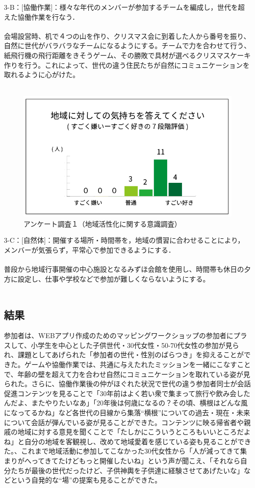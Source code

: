 \documentclass[a4paper]{jsarticle}
\begin{document}
3-B：[協働作業]：様々な年代のメンバーが参加するチームを編成し，世代を超えた協働作業を行なう．\\\\
会場設営時、机で４つの山を作り、クリスマス会に到着した人から番号を振り、自然に世代がバラバラなチームになるようにする。チームで力を合わせて行う、紙飛行機の飛行距離をきそうゲーム、その勝敗で具材が選べるクリスマスケーキ作りを行う。これによって、世代の違う住民たちが自然にコミュニケーションを取れるように心がけた。\\\\
\begin{figure}[H]
  \begin{center}
    \includegraphics[width=0.95\hsize]{./images/03.png}
    \caption{アンケート調査１（地域活性化に関する意識調査）}
    \label{fig:tmu_hino}
  \end{center}
\end{figure}
3-C：[自然体]：開催する場所・時間帯を，地域の慣習に合わせることにより，メンバーが気張らず，平常心で参加できるようにする．\\\\
普段から地域行事開催の中心施設となるみずほ会館を使用し、時間帯も休日の夕方に設定し、仕事や学校などで参加が難しくならないようにする。\\\\
\subsection{結果}
参加者は、WEBアプリ作成のためのマッピングワークショップの参加者にプラスして、小学生を中心とした子供世代・30代女性・50-70代女性の参加が見られ、課題としてあげられた「参加者の世代・性別のばらつき」を抑えることができた。ゲームや協働作業では、共通に与えたれたミッションを一緒にこなすことで、年齢の壁を超えて力を合わせ自然にコミュニケーションを取れている姿が見られた。さらに、協働作業後の仲がほぐれた状況で世代の違う参加者同士が会話促進コンテンツを見ることで「30年前はよく若い衆で集まって旅行や飲み会したんだよ、またやりたいなあ」「20年後は何歳になるの？その頃、横根はどんな風になってるかね」など各世代の目線から集落“横根”についての過去・現在・未来について会話が弾んでいる姿が見ることができた。コンテンツに映る帰省者や親戚の地域に対する意見を聞くことで「たしかにこういうところもいいところだよね」と自分の地域を客観視し、改めて地域愛着を感じている姿も見ることができた。、これまで地域活動に参加してこなかった30代女性から「人が減ってきて集まりがへってきてたけどもっと開催したいね」という声が聞こえ、「それなら自分たちが最後の世代だったけど、子供神輿を子供達に経験させてあげたいな」などという自発的な“場”の提案も見ることができた。
\end{document}

